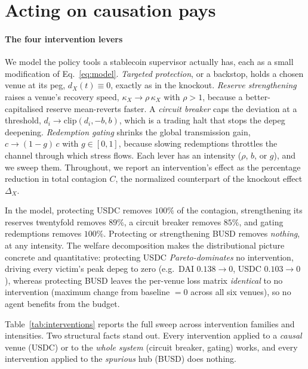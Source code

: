 \documentclass[sigconf,anonymous]{acmart}
\begin{document}
\section{Acting on causation pays}\label{sec:policy}

\paragraph{The four intervention levers} We model the policy tools a stablecoin supervisor actually
has, each as a small modification of Eq.~\eqref{eq:model}. \emph{Targeted protection}, or a backstop,
holds a chosen venue at its peg, $d_X(t)\equiv 0$, exactly as in the knockout. \emph{Reserve
strengthening} raises a venue's recovery speed, $\kappa_X\to\rho\,\kappa_X$ with $\rho>1$, because a
better-capitalised reserve mean-reverts faster. A \emph{circuit breaker} caps the deviation at a
threshold, $d_i\to\mathrm{clip}(d_i,-b,b)$, which is a trading halt that stops the depeg deepening.
\emph{Redemption gating} shrinks the global transmission gain, $c\to(1-g)\,c$ with $g\in[0,1]$,
because slowing redemptions throttles the channel through which stress flows. Each lever has an
intensity ($\rho$, $b$, or $g$), and we sweep them. Throughout, we report an intervention's
effect as the percentage reduction in total contagion $C$, the normalized counterpart of the
knockout effect $\Delta_X$.

In the model, protecting USDC removes $100\%$ of the contagion, strengthening its reserves
twentyfold removes $89\%$, a circuit breaker removes $85\%$, and gating
redemptions removes $100\%$. Protecting or strengthening BUSD removes \emph{nothing}, at any
intensity. The welfare decomposition makes the distributional picture concrete and quantitative:
protecting USDC \emph{Pareto-dominates} no intervention, driving every victim's peak depeg to
zero (e.g.\ DAI $0.138\!\to\!0$, USDC $0.103\!\to\!0$), whereas protecting BUSD leaves the
per-venue loss matrix \emph{identical} to no intervention (maximum change from baseline
$=0$ across all six venues), so no agent benefits from the budget.

Table~\ref{tab:interventions} reports the full sweep across intervention families and intensities.
Two structural facts stand out. Every intervention applied to a \emph{causal} venue (USDC) or to the
\emph{whole system} (circuit breaker, gating) works, and every intervention applied to the
\emph{spurious} hub (BUSD) does nothing.
\end{document}

